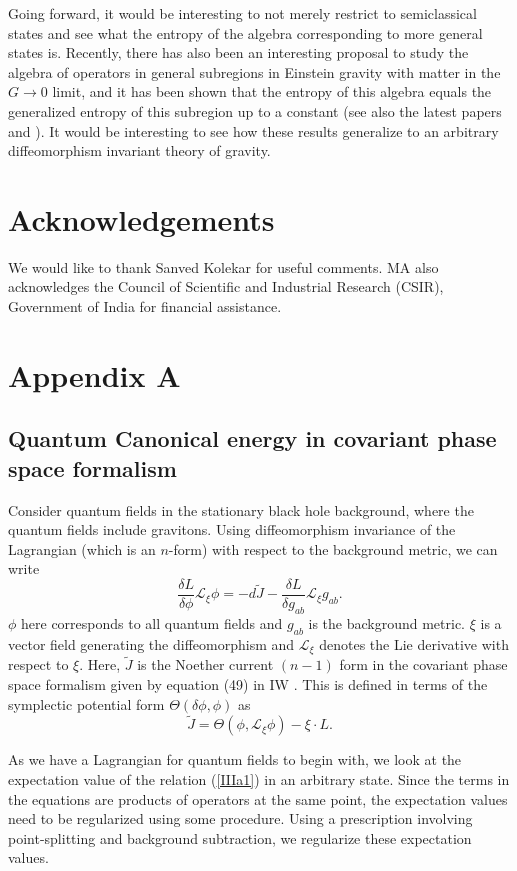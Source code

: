 \documentclass[12pt]{article}
\begin{document}
Going forward, it would be interesting to not merely restrict to semiclassical states and see what the entropy of the algebra corresponding to more general states is. Recently, there has also been an interesting proposal to study the algebra of operators in general subregions in Einstein gravity with matter in the $G \to 0$ limit, and it has been shown that the entropy of this algebra equals the generalized entropy of this subregion up to a constant \cite{sorce} (see also the latest papers \cite{jefferson} and \cite{leigh}). It would be interesting to see how these results generalize to an arbitrary diffeomorphism invariant theory of gravity.
\section{Acknowledgements} We would like to thank Sanved Kolekar for useful comments. MA also acknowledges the Council of Scientific and Industrial Research (CSIR), Government of India for financial assistance.
\section{Appendix A}\label{a}
\subsection{Quantum Canonical energy in covariant phase space formalism}
Consider quantum fields in the stationary black hole background, where the quantum fields include gravitons. Using diffeomorphism invariance of the Lagrangian (which is an $n$-form) with respect to the background metric, we can write
\begin{equation}\label{IIIa1}
 \frac{\delta L}{\delta \phi}\mathcal{L}_{\xi}\phi= -d\tilde J- \frac{\delta L}{\delta g_{ab}}\mathcal{L}_{\xi}g_{ab} .
\end{equation}
$\phi$ here corresponds to all quantum fields and $g_{ab}$ is the background metric. $\xi$ is a vector field generating the diffeomorphism and $\mathcal{L}_{\xi}$ denotes the Lie derivative with respect to $\xi$.
Here, $\tilde J$ is the Noether current $(n-1)$ form in the covariant phase space formalism given by equation (49) in IW \cite{VR}. This is defined in terms of the symplectic potential form $\Theta(\delta \phi, \phi)$ as
\begin{equation}\label{IIIc}
\tilde J = \Theta(\phi, \mathcal{L}_{\xi} \phi ) - \xi \cdot L .
\end{equation}

As we have a Lagrangian for quantum fields to begin with, we look at the expectation value of the relation (\ref{IIIa1}) in an arbitrary state. Since the terms in the equations are products of operators at the same point, the expectation values need to be regularized using some procedure. Using a prescription involving point-splitting and background subtraction, we regularize these expectation values.
\end{document}

